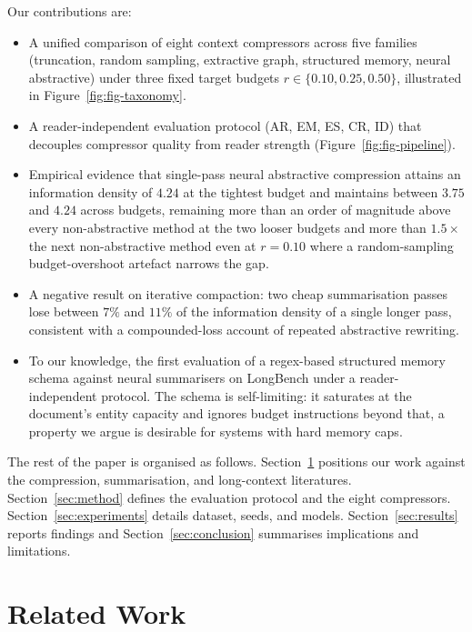 \documentclass[11pt]{article}
\begin{document}
Our contributions are:
\begin{itemize}
 \item A unified comparison of eight context compressors across five
 families (truncation, random sampling, extractive graph, structured
 memory, neural abstractive) under three fixed target budgets
 $r \in \{0.10, 0.25, 0.50\}$, illustrated in
 Figure~\ref{fig:fig-taxonomy}.
 \item A reader-independent evaluation protocol (AR, EM, ES, CR, ID)
 that decouples compressor quality from reader strength
 (Figure~\ref{fig:fig-pipeline}).
 \item Empirical evidence that single-pass neural abstractive
 compression attains an information density of $\mathbf{4.24}$ at the
 tightest budget and maintains between $3.75$ and $4.24$ across
 budgets, remaining more than an order of magnitude above every
 non-abstractive method at the two looser budgets and more than
 $1.5\times$ the next non-abstractive method even at $r=0.10$ where
 a random-sampling budget-overshoot artefact narrows the gap.
 \item A negative result on iterative compaction: two cheap summarisation
 passes lose between $7\%$ and $11\%$ of the information density of a
 single longer pass, consistent with a compounded-loss account of
 repeated abstractive rewriting.
 \item To our knowledge, the first evaluation of a regex-based
 structured memory schema against neural summarisers on LongBench
 under a reader-independent protocol. The schema is
 self-limiting: it saturates at the document's entity capacity and
 ignores budget instructions beyond that, a property we argue is
 desirable for systems with hard memory caps.
\end{itemize}

The rest of the paper is organised as follows.
Section~\ref{sec:related-work} positions our work against the compression,
summarisation, and long-context literatures.
Section~\ref{sec:method} defines the evaluation protocol and the eight
compressors. Section~\ref{sec:experiments} details dataset, seeds, and
models. Section~\ref{sec:results} reports findings and
Section~\ref{sec:conclusion} summarises implications and limitations.

\section{Related Work}
\label{sec:related-work}
\end{document}
